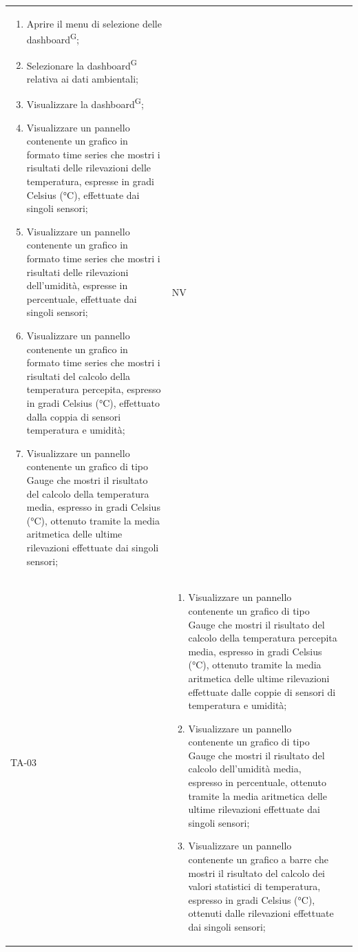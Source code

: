 \documentclass[8pt]{article}
\newcommand{\glossterm}[1]{#1\textsuperscript{G}} %
\begin{document}
\begin{longtable}{|>{\centering}p{2cm}|>{\RaggedRight}m{12cm}|>{\centering\arraybackslash}p{2cm}|}
\begin{enumerate}
        \setlength\itemsep{0em}
        \item Aprire il menu di selezione delle \glossterm{dashboard};
        \item Selezionare la \glossterm{dashboard} relativa ai dati ambientali;
        \item Visualizzare la \glossterm{dashboard};
        \item Visualizzare un pannello contenente un grafico in formato time series che mostri i
            risultati delle rilevazioni delle temperatura, espresse in gradi Celsius (°C),
            effettuate dai singoli sensori;
        \item Visualizzare un pannello contenente un grafico in formato time series che mostri i
            risultati delle rilevazioni dell’umidità, espresse in percentuale, effettuate dai
            singoli sensori;
        \item Visualizzare un pannello contenente un grafico in formato time series che mostri i
            risultati del calcolo della temperatura percepita, espresso in gradi Celsius (°C),
            effettuato dalla coppia di sensori temperatura e umidità;
        \item Visualizzare un pannello contenente un grafico di tipo Gauge che mostri il risultato
            del calcolo della temperatura media, espresso in gradi Celsius (°C), ottenuto tramite la
            media aritmetica delle ultime rilevazioni effettuate dai singoli sensori;
        \end{enumerate}
        & NV \\
        TA-03 &
        \begin{enumerate}[start=8]
        \item Visualizzare un pannello contenente un grafico di tipo Gauge che mostri il risultato
            del calcolo della temperatura percepita media, espresso in gradi Celsius (°C), ottenuto tramite la
            media aritmetica delle ultime rilevazioni effettuate dalle coppie di sensori di temperatura e umidità;
        \item Visualizzare un pannello contenente un grafico di tipo Gauge che mostri il risultato
            del calcolo dell'umidità media, espresso in percentuale, ottenuto tramite la
            media aritmetica delle ultime rilevazioni effettuate dai singoli sensori;
        \item Visualizzare un pannello contenente un grafico a barre che mostri il risultato
            del calcolo dei valori statistici di temperatura, espresso in gradi Celsius (°C), ottenuti dalle rilevazioni effettuate dai singoli sensori;

\end{enumerate}
\end{longtable}
\end{document}
